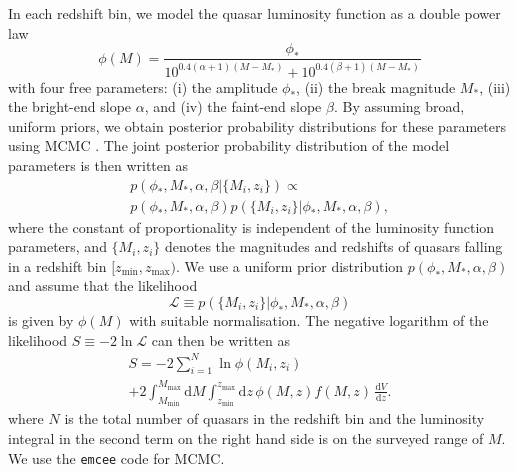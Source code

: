 \documentclass[fleqn,usenatbib]{mnras}
\begin{document}
In each redshift bin, we model the quasar
luminosity function as a double power law 
\citep[e.g.][]{1988MNRAS.235..935B}
\begin{equation}
  \phi(M) =
  \frac{\phi_*}{10^{0.4(\alpha+1)(M-M_*)}+10^{0.4(\beta+1)(M-M_*)}}
  \label{eqn:dpl}
\end{equation}
with four free parameters: (i) the amplitude $\phi_*$, (ii) the break magnitude $M_*$,
(iii)  the bright-end slope $\alpha$, and (iv) the faint-end slope $\beta$.
By assuming broad, uniform priors, we obtain posterior probability
distributions for these parameters using MCMC \citep[e.g.,][]{jaynes}.
The joint posterior probability distribution of the model parameters
is then written as
\begin{multline}
  p(\phi_*, M_*, \alpha, \beta | \{M_i, z_i\}) \propto \\ p(\phi_*, M_*,
  \alpha, \beta)p(\{M_i, z_i\} | \phi_*, M_*, \alpha, \beta),
\end{multline}
where the constant of proportionality is independent of the luminosity
function parameters, and $\{M_i, z_i\}$ denotes the magnitudes and
redshifts of quasars falling in a redshift bin $[z_\mathrm{min},
  z_\mathrm{max})$.  We use a uniform prior distribution $p(\phi_*,
  M_*, \alpha, \beta)$ and assume that the likelihood
\begin{equation}
  \mathcal{L}\equiv p(\{M_i, z_i\} | \phi_*, M_*, \alpha, \beta)
\end{equation}
is given by $\phi(M)$
with suitable normalisation.  The negative
logarithm of the likelihood $S\equiv -2\ln\mathcal{L}$ can then be
written as
\begin{multline}
  S = -2\sum_{i=1}^N\ln\phi(M_i, z_i)\\+2\int_{M_\mathrm{min}}^{M_\mathrm{max}}\mathrm{d}M
  \int_{z_\mathrm{min}}^{z_\mathrm{max}}\mathrm{d}z\, \phi(M,z) f(M, z)\,\frac{\mathrm{d}V}{\mathrm{d}z}.
  \label{eqn:S}
\end{multline}
where $N$ is the total number of quasars in the redshift bin and the
luminosity integral in the second term on the right hand side is on
the surveyed range of $M$.  We use the \texttt{emcee} code
\citep{2013PASP..125..306F} for MCMC.
\end{document}
